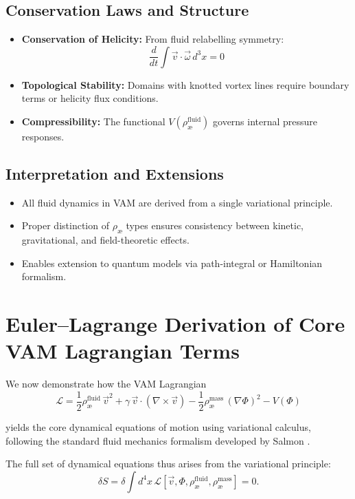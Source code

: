 \documentclass[12pt]{article}
\begin{document}
\subsection{Conservation Laws and Structure}
\begin{itemize}
    \item \textbf{Conservation of Helicity:} From fluid relabelling symmetry:
    \[
        \frac{d}{dt} \int \vec{v} \cdot \vec{\omega} \, d^3x = 0
    \]
    \item \textbf{Topological Stability:} Domains with knotted vortex lines require boundary terms or helicity flux conditions.
    \item \textbf{Compressibility:} The functional \( V(\rho_\text{\ae}^{\text{fluid}}) \) governs internal pressure responses.
\end{itemize}

\subsection*{Interpretation and Extensions}
\begin{itemize}
    \item All fluid dynamics in VAM are derived from a single variational principle.
    \item Proper distinction of \( \rho_\text{\ae} \) types ensures consistency between kinetic, gravitational, and field-theoretic effects.
    \item Enables extension to quantum models via path-integral or Hamiltonian formalism.
\end{itemize}

\section{Euler--Lagrange Derivation of Core VAM Lagrangian Terms}\label{sec:EL-derivation}

We now demonstrate how the VAM Lagrangian
\[
    \mathcal{L} = \frac{1}{2} \rho_\text{\ae}^{\text{fluid}}\, \vec{v}^2 + \gamma\, \vec{v} \cdot (\nabla \times \vec{v}) - \frac{1}{2} \rho_\text{\ae}^{\text{mass}}\, (\nabla \Phi)^2 - V(\Phi)
\]

yields the core dynamical equations of motion using variational calculus, following the standard fluid mechanics formalism developed by Salmon \cite{salmon1988}.

The full set of dynamical equations thus arises from the variational principle:
\[
    \delta S = \delta \int d^4x\, \mathcal{L}[\vec{v}, \Phi, \rho_\text{\ae}^{\text{fluid}}, \rho_\text{\ae}^{\text{mass}}] = 0.
\]
\end{document}
